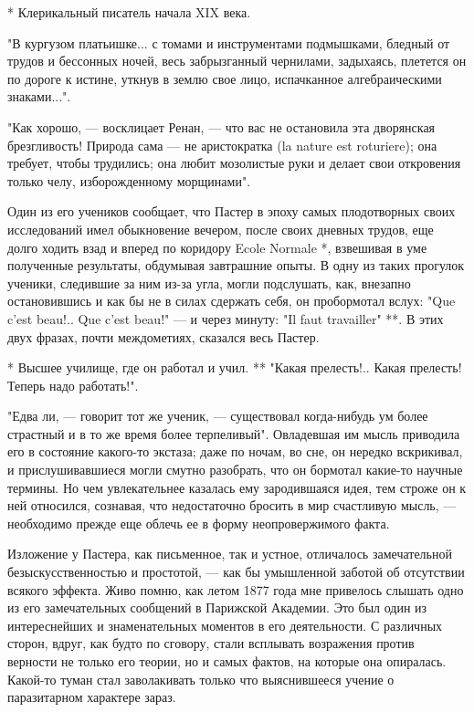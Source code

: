* Клерикальный писатель начала XIX века.

"В кургузом платьишке... с томами и инструментами подмышками, бледный от
трудов  и  бессонных  ночей,  весь  забрызганный  чернилами,  задыхаясь,
плетется он по дороге  к истине, уткнув в  землю свое лицо,  испачканное
алгебраическими знаками...".

"Как хорошо, --- восклицает Ренан, --- что вас не остановила эта  дворянская
брезгливость! Природа сама --- не аристократка (la nature est  roturiere);
она требует, чтобы трудились;  она любит мозолистые  руки и делает  свои
откровения только челу, изборожденному морщинами".

Один из его  учеников сообщает,  что Пастер в  эпоху самых  плодотворных
своих исследований имел обыкновение вечером, после своих дневных трудов,
еще долго ходить взад и вперед по коридору Ecole Normale *, взвешивая  в
уме полученные результаты, обдумывая завтрашние  опыты. В одну из  таких
прогулок ученики, следившие  за ним из-за  угла, могли подслушать,  как,
внезапно остановившись и как бы не в силах сдержать себя, он пробормотал
вслух: "Que c'est beau!..  Que c'est beau!" ---  и через минуту: "Il  faut
travailler"  **. В  этих двух фразах,  почти междометиях, сказался  весь
Пастер.

* Высшее училище, где он работал и учил.
** "Какая прелесть!.. Какая прелесть! Теперь надо работать!".

"Едва ли, --- говорит тот же  ученик, --- существовал когда-нибудь ум  более
страстный и  в  то  же  время более  терпеливый".  Овладевшая  им  мысль
приводила его в состояние какого-то экстаза;  даже по ночам, во сне,  он
нередко вскрикивал, и  прислушивавшиеся могли смутно  разобрать, что  он
бормотал какие-то  научные термины.  Но чем  увлекательнее казалась  ему
зародившаяся  идея,  тем  строже  он  к  ней  относился,  сознавая,  что
недостаточно бросить в  мир счастливую  мысль, ---  необходимо прежде  еще
облечь ее в форму неопровержимого факта.

Изложение  у  Пастера,   как  письменное,  так   и  устное,   отличалось
замечательной безыскусственностью  и  простотой,  ---  как  бы  умышленной
заботой об отсутствии всякого эффекта.  Живо помню, как летом 1877  года
мне привелось слышать  одно из его  замечательных сообщений в  Парижской
Академии. Это был один из интереснейших и знаменательных моментов в  его
деятельности. С различных  сторон, вдруг,  как будто  по сговору,  стали
всплывать возражения против верности  не только его  теории, но и  самых
фактов, на  которые  она  опиралась. Какой-то  туман  стал  заволакивать
только что выяснившееся учение о паразитарном характере зараз.

